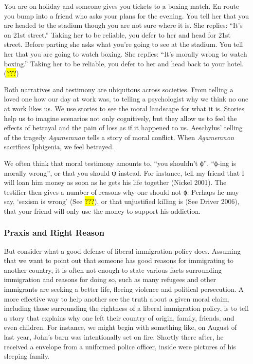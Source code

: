 \documentclass[
  letterpaper,
  DIV=11,
  numbers=noendperiod]{scrartcl}
\theoremstyle{remark}
\begin{document}
You are on holiday and someone gives you tickets to a boxing match. En
route you bump into a friend who asks your plans for the evening. You
tell her that you are headed to the stadium though you are not sure
where it is. She replies: ``It's on 21st street.'' Taking her to be
reliable, you defer to her and head for 21st street. Before parting she
asks what you're going to see at the stadium. You tell her that you are
going to watch boxing. She replies: ``It's morally wrong to watch
boxing.'' Taking her to be reliable, you defer to her and head back to
your hotel. (\hl{???})

Both narratives and testimony are ubiquitous across societies. From
telling a loved one how our day at work was, to telling a psychologist
why we think no one at work likes us. We use stories to see the moral
landscape for what it is. Stories help us to imagine scenarios not only
cognitively, but they allow us to feel the effects of betrayal and the
pain of loss as if it happened to us. Aeschylus' telling of the tragedy
\emph{Agamemnon} tells a story of moral conflict. When \emph{Agamemnon}
sacrifices Iphigenia, we feel betrayed.

We often think that moral testimony amounts to, ``you shouldn't ϕ'',
``ϕ-ing is morally wrong'', or that you should ψ instead. For instance,
tell my friend that I will loan him money as soon as he gets his life
together (Nickel 2001). The testifier then gives a number of reasons why
one should not ϕ. Perhaps he may say, `sexism is wrong' (See \hl{???}),
or that unjustified killing is (See Driver 2006), that your friend will
only use the money to support his addiction.

\subsubsection{Praxis and Right Reason}\label{praxis-and-right-reason}

But consider what a good defense of liberal immigration policy does.
Assuming that we want to point out that someone has good reasons for
immigrating to another country, it is often not enough to state various
facts surrounding immigration and reasons for doing so, such as many
refugees and other immigrants are seeking a better life, fleeing
violence and political persecution. A more effective way to help another
see the truth about a given moral claim, including those surrounding the
rightness of a liberal immigration policy, is to tell a story that
explains why one left their country of origin, family, friends, and even
children. For instance, we might begin with something like, on August of
last year, John's barn was intentionally set on fire. Shortly there
after, he received a envelope from a uniformed police officer, inside
were pictures of his sleeping family.
\end{document}
